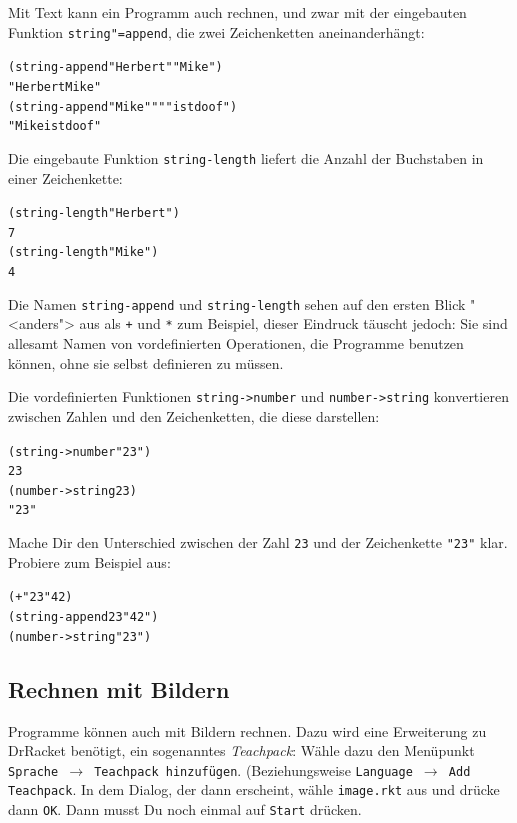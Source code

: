 Mit Text kann ein Programm auch rechnen, und zwar mit der eingebauten
Funktion
\texttt{string"=append},
die zwei Zeichenketten aneinanderhängt:
%
\begin{alltt}
(string-append "Herbert" "Mike")
\evalsto{} "HerbertMike"
(string-append "Mike" " " "ist doof")
\evalsto{} "Mike ist doof"
\end{alltt}
%
Die eingebaute Funktion
\texttt{string-length}
liefert die Anzahl der Buchstaben in einer Zeichenkette:
%
\begin{alltt}
(string-length "Herbert")
\evalsto{} 7
(string-length "Mike")
\evalsto{} 4
\end{alltt}
%
Die Namen \texttt{string-append} und \texttt{string-length} sehen auf
den ersten Blick "<anders"> aus als \texttt{+} und \texttt{*} zum
Beispiel, dieser Eindruck täuscht jedoch: Sie sind allesamt Namen von
vordefinierten Operationen, die Programme benutzen können, ohne sie
selbst definieren zu müssen.

Die vordefinierten Funktionen
\texttt{string->number}
und \texttt{number->string} konvertieren zwischen Zahlen und den
Zeichenketten, die diese darstellen:
%
\begin{alltt}
(string->number "23")
\evalsto{} 23
(number->string 23)
\evalsto{} "23"
\end{alltt}
%
\begin{aufgabe}
  Mache Dir den Unterschied zwischen der Zahl \texttt{23} und der
  Zeichenkette \verb|"23"| klar.  Probiere zum Beispiel aus:
\begin{alltt}
(+ "23" 42)
(string-append 23 "42")
(number->string "23")
\end{alltt}
\end{aufgabe}

\subsection{Rechnen mit Bildern}

Programme können auch mit Bildern rechnen.  Dazu wird eine Erweiterung
zu DrRacket benötigt, ein sogenanntes
\textit{Teachpack}: Wähle dazu den Menüpunkt
\texttt{Sprache $\rightarrow$ Teachpack hinzufügen}.  (Beziehungsweise
\texttt{Language $\rightarrow$ Add Teachpack}.  In dem Dialog, der
dann erscheint, wähle \texttt{image.rkt} aus und drücke dann
\texttt{OK}.  Dann musst Du noch einmal auf \texttt{Start} drücken.

